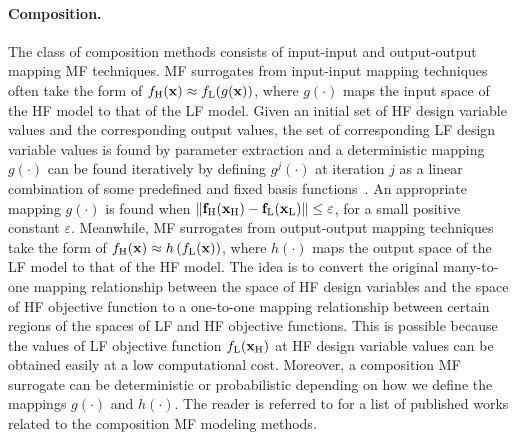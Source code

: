 \documentclass[iicol,sn-basic]{sn-jnl}%
\newcommand{\edit}[1]{\textcolor{red}{#1}} %
\begin{document}
\paragraph{Composition.}
The class of composition methods consists of input-input and output-output mapping MF techniques.
MF surrogates from input-input mapping techniques often take the form of
{$f_\text{H}({\bf x}) \approx f_\text{L}(g({\bf x}))$,
  where
  $g(\cdot)$ maps the input space of the HF model to that of the LF model.}
Given an initial set of HF design variable values and the corresponding output values, the set of corresponding LF design variable values is found by parameter extraction and a deterministic mapping $g(\cdot)$ can be found iteratively by defining  $g^j(\cdot)$ at iteration $j$ as a linear combination of some predefined and fixed basis functions~\citep{Bandler1994}.
An appropriate mapping $g(\cdot)$ is found when $\| {\bf f}_\text{H}({\bf x}_\text{H}) - {\bf f}_\text{L}({\bf x}_\text{L})\| \leq \varepsilon$, for a small positive constant $\varepsilon$. 
Meanwhile, MF surrogates from output-output mapping techniques take the form of
{$f_\text{H}({\bf x}) \approx h\left(f_\text{L}({\bf x})\right)$,
  where $h(\cdot)$ maps the output space of the LF model to that of the HF model.}
The idea is to convert the original many-to-one mapping relationship between the space of HF design variables and the space of HF objective function to a one-to-one mapping relationship between certain regions of the spaces of LF and HF objective functions. 
This is possible because the values of LF objective function $f_\text{L}({\bf x}_\text{H})$ at HF design variable values can be obtained easily at a low computational cost.
Moreover, a composition MF surrogate can be deterministic or probabilistic depending on how we define the mappings $g(\cdot)$ and $h(\cdot)$.
The reader is referred to  for a list of published works related to the composition MF modeling methods.
\end{document}
